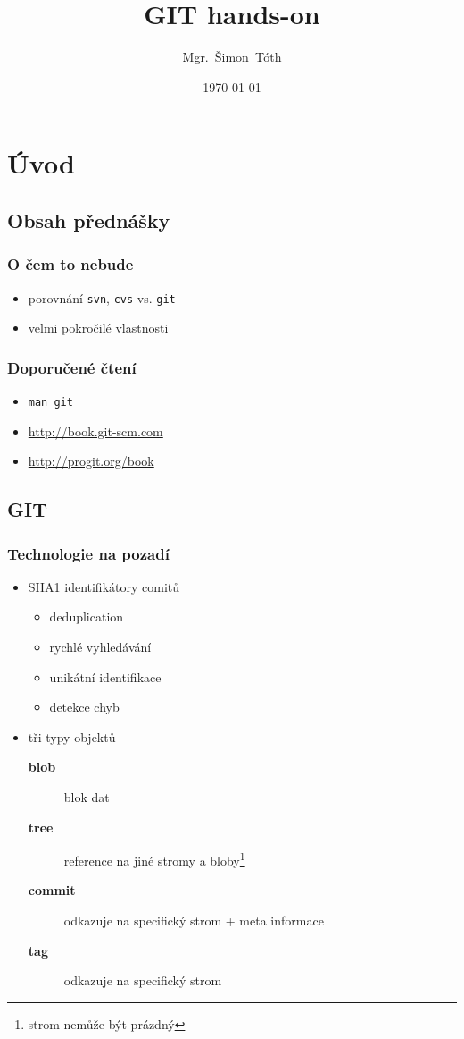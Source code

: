 \documentclass[pdftex]{beamer}
\title{GIT hands-on}
\author[]{Mgr.~Šimon~Tóth}
\date{\today}
\begin{document}

\begin{frame}
	\titlepage
\end{frame}

\section{Úvod}
\subsection*{Obsah přednášky}

\begin{frame}
\frametitle{O čem to nebude}
	\begin{itemize}
		\item	porovnání \texttt{svn}, \texttt{cvs} vs. \texttt{git}
		\item	velmi pokročilé vlastnosti
	\end{itemize}
\end{frame}

\begin{frame}
\frametitle{Doporučené čtení}
	\begin{itemize}
		\item	\texttt{man git}
		\item	\url{http://book.git-scm.com}
		\item	\url{http://progit.org/book}
	\end{itemize}
\end{frame}

\subsection{GIT}

\begin{frame}
\frametitle{Technologie na pozadí}
	\begin{itemize}
		\item	SHA1 identifikátory comitů
		\begin{itemize}
			\item	deduplication
			\item	rychlé vyhledávání
			\item	unikátní identifikace
			\item	detekce chyb
		\end{itemize}
		\item	tři typy objektů
		\begin{description}
			\item[\textbf{blob}]	blok dat
			\item[\textbf{tree}]	reference na jiné stromy a bloby\footnote{strom nemůže být prázdný}
			\item[\textbf{commit}]	odkazuje na specifický strom + meta informace
			\item[\textbf{tag}]	odkazuje na specifický strom
		\end{description}
	\end{itemize}
\end{frame}
\end{document}
